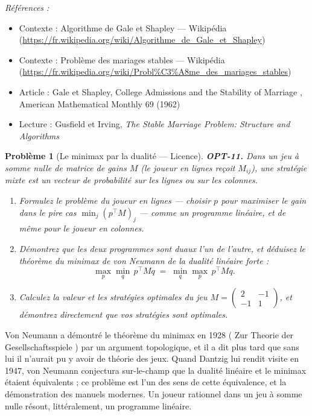 \documentclass[11pt]{article}
\newtheorem{problem}{Problème}
\newenvironment{refs}{\par\small\noindent\emph{Références :}\begin{itemize}\setlength\itemsep{0pt}}{\end{itemize}\normalsize}
\begin{document}
\begin{refs}
\item Contexte : Algorithme de Gale et Shapley --- Wikipédia (\url{https://fr.wikipedia.org/wiki/Algorithme_de_Gale_et_Shapley})
\item Contexte : Problème des mariages stables --- Wikipédia (\url{https://fr.wikipedia.org/wiki/Probl%C3%A8me_des_mariages_stables})
\item Article : Gale et Shapley, \og{} College Admissions and the Stability of Marriage \fg{}, American Mathematical Monthly 69 (1962)
\item Lecture : Gusfield et Irving, \textit{The Stable Marriage Problem: Structure and Algorithms}
\end{refs}

\bigskip

\begin{problem}[{Le minimax par la dualité --- Licence}]
\textbf{OPT-11.} Dans un jeu à somme nulle de matrice de gains $M$ (le joueur en lignes reçoit $M_{ij}$), une stratégie mixte est un vecteur de probabilité sur les lignes ou sur les colonnes.
\begin{enumerate}
\item[(a)] Formulez le problème du joueur en lignes --- choisir $p$ pour maximiser le gain dans le pire cas $\min_j (p^\top M)_j$ --- comme un programme linéaire, et de même pour le joueur en colonnes.
\item[(b)] Démontrez que les deux programmes sont duaux l'un de l'autre, et déduisez le théorème du minimax de von Neumann de la dualité linéaire forte :
\[ \max_p \min_q\, p^\top M q \;=\; \min_q \max_p\, p^\top M q. \]
\item[(c)] Calculez la valeur et les stratégies optimales du jeu $M = \begin{pmatrix} 2 & -1 \\ -1 & 1 \end{pmatrix}$, et démontrez directement que vos stratégies sont optimales.
\end{enumerate}

\end{problem}

\noindent Von Neumann a démontré le théorème du minimax en 1928 (\og{} Zur Theorie der Gesellschaftsspiele \fg{}) par un argument topologique, et il a dit plus tard que sans lui il n'aurait pu y avoir de théorie des jeux. Quand Dantzig lui rendit visite en 1947, von Neumann conjectura sur-le-champ que la dualité linéaire et le minimax étaient équivalents ; ce problème est l'un des sens de cette équivalence, et la démonstration des manuels modernes. Un joueur rationnel dans un jeu à somme nulle résout, littéralement, un programme linéaire.
\end{document}
